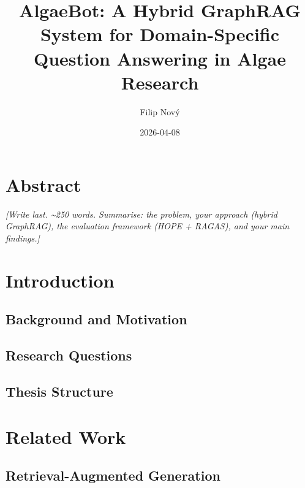 \documentclass[
  english,
  12pt,
]{report}
\title{AlgaeBot: A Hybrid GraphRAG System for Domain-Specific Question
Answering in Algae Research}
\author{Filip Nový}
\date{2026-04-08}
\renewcommand*\contentsname{Table of contents}
\newcommand\contentsname{Table of contents}
\begin{document}
\maketitle

\renewcommand*\contentsname{Table of contents}
{
\hypersetup{linkcolor=}
\setcounter{tocdepth}{2}
\tableofcontents
}
\listoffigures
\listoftables

\newpage

\chapter*{Abstract}\label{abstract}

\emph{{[}Write last. \textasciitilde250 words. Summarise: the problem,
your approach (hybrid GraphRAG), the evaluation framework (HOPE +
RAGAS), and your main findings.{]}}

\newpage

\chapter{Introduction}\label{introduction}

\section{Background and Motivation}\label{background-and-motivation}

\section{Research Questions}\label{research-questions}

\section{Thesis Structure}\label{thesis-structure}

\newpage

\chapter{Related Work}\label{related-work}

\section{Retrieval-Augmented
Generation}\label{retrieval-augmented-generation}
\end{document}
